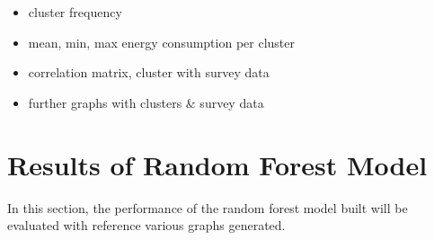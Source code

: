 \begin{itemize}
    \item cluster frequency
    \item mean, min, max energy consumption per cluster
    \item correlation matrix, cluster with survey data
    \item further graphs with clusters \& survey data
\end{itemize}


\section{Results of Random Forest Model}
In this section, the performance of the random forest model built will be evaluated with reference various graphs generated.